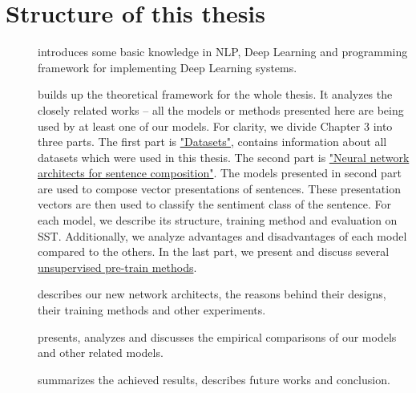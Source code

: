 \section{Structure of this thesis}
\begin{description}
\item [] introduces some basic knowledge in NLP, Deep Learning and programming framework for implementing Deep Learning systems.
\item [] builds up the theoretical framework for the whole thesis.
It analyzes the closely related works -- all the models or methods presented here are being used by at least one of our models.
For clarity, we divide Chapter 3 into three parts.
The first part is \hyperref[sec:dataset]{"Datasets"}, contains information about all datasets which were used in this thesis.
The second part is \hyperref[sec:composer]{"Neural network architects for sentence composition"}.
The models presented in second part are used to compose vector presentations of sentences.
These presentation vectors are then used to classify the sentiment class of the sentence.
For each model, we describe its structure, training method and evaluation on SST.
Additionally, we analyze advantages and disadvantages of each model compared to the others.
In the last part, we present and discuss several \hyperref[sec:unsupervised-pretrain]{unsupervised pre-train methods}.
\item [] describes our new network architects, the reasons behind their designs, their training methods and other experiments.
\item [] presents, analyzes and discusses the empirical comparisons of our models and other related models.
\item [] summarizes the achieved results, describes future works and conclusion.
\end{description}
